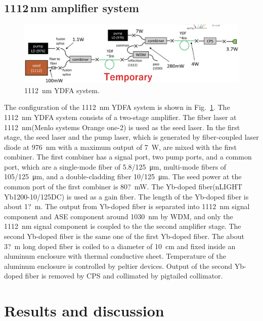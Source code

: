 \documentclass{osa-article}
\begin{document}
\subsection{1112\,nm amplifier system}

\begin{figure}[h!]
  \centering\includegraphics[width=\linewidth]{./Figure/1112nmYDFASystem_Temp.eps}
  \caption{\SI{1112}{\nm} YDFA system.}
  \label{fig:1112YDFASystem}
\end{figure}

The configuration of the \SI{1112}{\nm} YDFA system is shown in Fig.~\ref{fig:1112YDFASystem}.
The \SI{1112}{\nm} YDFA system consists of a two-stage amplifier.
The fiber laser at \SI{1112}{\nm}(Menlo systems Orange one-2) is used as the seed laser.
In the first stage, the seed laser and the pump laser, which is generated by fiber-coupled laser diode at \SI{976}{\nm} with a maximum output of \SI{7}{\W}, are mixed with the first combiner.
The first combiner has a signal port, two pump ports, and a common port, which are a single-mode fiber of \SI{5.8/125}{\um}, multi-mode fibers of \SI{105/125}{\um}, and a double-cladding fiber \SI{10/125}{\um}.
The seed power at the common port of the first combiner is \SI{80?}{\mW}.
The Yb-doped fiber(nLIGHT Yb1200-10/125DC) is used as a gain fiber.
The length of the Yb-doped fiber is about \SI{1?}{m}.
The output from Yb-doped fiber is separated into \SI{1112}{\nm} signal component and ASE component around \SI{1030}{\nm} by WDM, and only the \SI{1112}{\nm} signal component is coupled to the the second amplifier stage.
The second Yb-doped fiber is the same one of the first Yb-doped fiber.
The about \SI{3?}{m} long doped fiber is coiled to a diameter of \SI{10}{\cm} and fixed inside an aluminum enclosure with thermal conductive sheet.
Temperature of the aluminum enclosure is controlled by peltier devices.
Output of the second Yb-doped fiber is removed by CPS and collimated by pigtailed collimator.


\section{Results and discussion}
\end{document}
